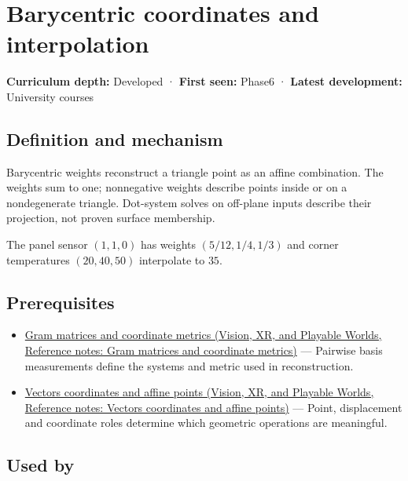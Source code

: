 \hypertarget{appendix-02b9d9a81dca}{}\label{referencestart:appendix-02b9d9a81dca}
\section{Barycentric coordinates and interpolation}\label{appendix-02b9d9a81dca-barycentric-coordinates-and-interpolation}

\textbf{Curriculum depth:} Developed · \textbf{First seen:} Phase6 · \textbf{Latest development:} University courses

\subsection{Definition and mechanism}\label{appendix-02b9d9a81dca-definition-and-mechanism}

Barycentric weights reconstruct a triangle point as an affine combination. The weights sum to one; nonnegative weights describe points inside or on a nondegenerate triangle. Dot-system solves on off-plane inputs describe their projection, not proven surface membership.

The panel sensor \((1,1,0)\) has weights \((5/12,1/4,1/3)\) and corner temperatures \((20,40,50)\) interpolate to \(35\).

\subsection{Prerequisites}\label{appendix-02b9d9a81dca-prerequisites}

\begin{itemize}
\tightlist
\item
  \href{../07-Vision-XR-and-Playable-Worlds/main.pdf\#nameddest=appendix-3b863809f82a}{Gram matrices and coordinate metrics (Vision, XR, and Playable Worlds, Reference notes: Gram matrices and coordinate metrics)} --- Pairwise basis measurements define the systems and metric used in reconstruction.
\item
  \href{../07-Vision-XR-and-Playable-Worlds/main.pdf\#nameddest=appendix-0659864c0aa3}{Vectors coordinates and affine points (Vision, XR, and Playable Worlds, Reference notes: Vectors coordinates and affine points)} --- Point, displacement and coordinate roles determine which geometric operations are meaningful.
\end{itemize}

\subsection{Used by}\label{appendix-02b9d9a81dca-used-by}

